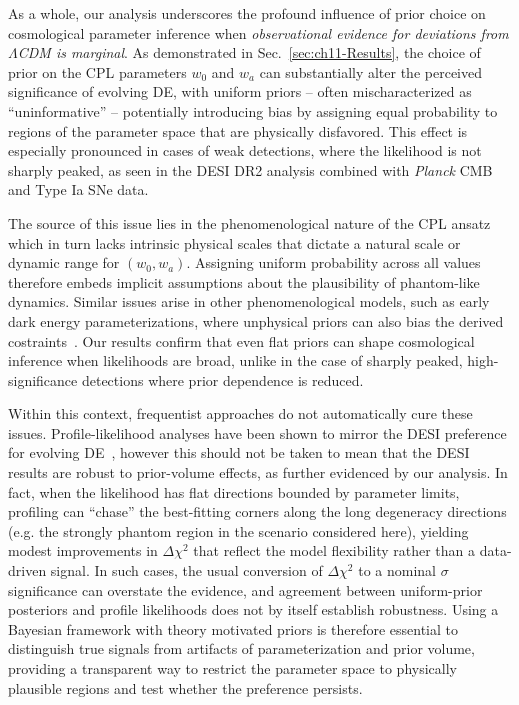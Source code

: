 As a whole, our analysis underscores the profound influence of prior choice on cosmological parameter inference when \textit{observational evidence for deviations from $\Lambda$CDM is marginal}. As demonstrated in Sec.~\ref{sec:ch11-Results}, the choice of prior on the CPL parameters $w_0$ and $w_a$ can substantially  alter the perceived significance of evolving DE, with uniform priors -- often mischaracterized as ``uninformative'' -- potentially introducing bias by assigning equal probability to regions of the parameter space that are physically disfavored. This effect is especially pronounced in cases of weak detections, where the likelihood is not sharply peaked, as seen in the DESI DR2 analysis combined with \textit{Planck} CMB and Type Ia SNe data.

The source of this issue lies in the phenomenological nature of the CPL ansatz
which in turn lacks intrinsic physical scales that dictate a natural scale or dynamic range  for $(w_0,w_a)$. Assigning uniform probability across all values
therefore embeds implicit assumptions
about the plausibility of phantom-like dynamics. Similar issues arise in other phenomenological models, such as early dark energy parameterizations, where unphysical priors can also bias the derived costraints~\cite{Toomey:2024ita}. Our results confirm that even flat priors
can shape cosmological inference when likelihoods are broad, unlike in the case of sharply peaked, high-significance detections where prior dependence is reduced.


Within this context, frequentist approaches do not automatically cure these issues.
Profile-likelihood analyses have been shown to mirror the DESI preference for evolving DE~\cite{Herold:2025hkb}, however this should not be taken to mean that the DESI results are robust to prior-volume effects, as further evidenced by our analysis. In fact, when the likelihood has flat directions bounded by parameter limits, profiling can ``chase'' the best-fitting corners along the long degeneracy directions (e.g. the strongly phantom region in the scenario considered here), yielding modest improvements in $\Delta\chi^2$ that reflect the model flexibility rather than a data-driven signal. In such cases, the usual conversion of
$\Delta\chi^2$ to a nominal $\sigma$ significance can overstate the evidence, and agreement between uniform-prior posteriors and profile likelihoods does not by itself establish robustness. Using a Bayesian framework with theory motivated priors is therefore essential to distinguish true signals from artifacts of parameterization and prior volume, providing a transparent way to restrict the parameter space to physically plausible regions and test whether the preference persists.


